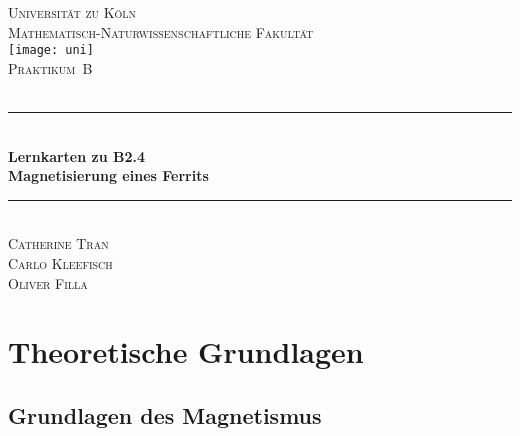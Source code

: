 \documentclass[12pt,a4paper]{scrartcl}
\numberwithin{equation}{section} %
\newcommand{\HRule}{\rule{\linewidth}{0.7mm}}
\renewcommand{\[}{} %
\renewcommand{\]}{\noindent} %
\begin{document}
\begin{titlepage}
	\pagestyle{empty}

	\begin{center}

	\textsc{\LARGE Universität zu Köln }\\ [0.4cm]
	\textsc{Mathematisch-Naturwissenschaftliche Fakultät} \\[1.5cm]

	\texttt{[image: uni]}\\[1.5cm]  %

	\textsc{\Large Praktikum~B}\\[2mm]
	\textsc{}\\[10mm]
	\HRule \\[0.4cm]

		{	\Huge \bfseries Lernkarten zu B2.4}\\[0.4cm]
			{	\huge \bfseries Magnetisierung eines Ferrits}\\[0.3cm]
	
	\HRule \\[3cm]

			\textsc{\Large Catherine Tran } \\[3pt]
		\textsc{\Large Carlo Kleefisch } \\[3pt]
		\textsc{\Large Oliver Filla } \\[3pt]
		
	\end{center}
\end{titlepage}

\newpage
\tableofcontents
\newpage

\hypertarget{theoretische-grundlagen}{%
\section{Theoretische Grundlagen}\label{theoretische-grundlagen}}

\hypertarget{grundlagen-des-magnetismus}{%
\subsection{Grundlagen des
Magnetismus}\label{grundlagen-des-magnetismus}}
\end{document}

